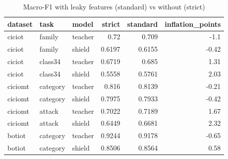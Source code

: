 \begin{table}
\caption{Macro-F1 with leaky features (standard) vs without (strict)}
\begin{tabular}{lllrrr}
\toprule
dataset & task & model & strict & standard & inflation_points \\
\midrule
ciciot & family & teacher & 0.72 & 0.709 & -1.1 \\
ciciot & family & shield & 0.6197 & 0.6155 & -0.42 \\
ciciot & class34 & teacher & 0.6719 & 0.685 & 1.31 \\
ciciot & class34 & shield & 0.5558 & 0.5761 & 2.03 \\
ciciomt & category & teacher & 0.816 & 0.8139 & -0.21 \\
ciciomt & category & shield & 0.7975 & 0.7933 & -0.42 \\
ciciomt & attack & teacher & 0.7022 & 0.7189 & 1.67 \\
ciciomt & attack & shield & 0.6449 & 0.6681 & 2.32 \\
botiot & category & teacher & 0.9244 & 0.9178 & -0.65 \\
botiot & category & shield & 0.8506 & 0.8564 & 0.58 \\
\bottomrule
\end{tabular}
\end{table}
